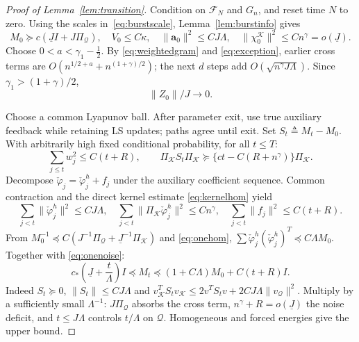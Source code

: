 \documentclass[11pt,reqno]{amsart}
\numberwithin{equation}{section}
\theoremstyle{definition}
\theoremstyle{remark}
\newcommand{\F}{\mathcal F}
\newcommand{\phc}{\check{\varphi}}
\begin{document}
\begin{proof}[Proof of Lemma~\ref{lem:transition}]
Condition on $\F_N$ and $G_n$, and reset time $N$ to zero. Using the scales in~\eqref{eq:burstscale}, Lemma~\ref{lem:burstinfo} gives
\begin{equation*}
 M_0\succeq c(\underline J I+J\Pi_{\mathcal Q}),\quad V_0\le C\kappa,\quad
 \|\mathbf a_0\|^2\le CJ\Lambda,\quad
 \|\chi_0^{\mathcal K}\|^2\le Cn^\gamma=o(\underline J).
\end{equation*}
Choose $0<a<\gamma_1-\tfrac12$. By \eqref{eq:weightedgram} and \eqref{eq:exception}, earlier cross terms are $O(n^{1/2+a}+n^{(1+\gamma)/2})$; the next $d$ steps add $O(\sqrt{n^\gamma J\Lambda})$. Since $\gamma_1>(1+\gamma)/2$,
\begin{equation*} \|Z_0\|/J\to0.\end{equation*}

Choose a common Lyapunov ball. After parameter exit, use true auxiliary feedback while retaining LS updates; paths agree until exit. Set $S_t\triangleq M_t-M_0$. With arbitrarily high fixed conditional probability, for all $t\le T$:
\begin{equation}\label{eq:onenoise}
 \sum_{j\le t}w_j^2\le C(t+R),\qquad
 \Pi_{\mathcal K} S_t\Pi_{\mathcal K}\succeq
 \{ct-C(R+n^\gamma)\}\Pi_{\mathcal K}.
\end{equation}
Decompose $\phc_j=\phc_j^h+f_j$ under the auxiliary coefficient sequence. Common contraction and the direct kernel estimate
\eqref{eq:kernelhom} yield
\begin{equation}\label{eq:onehom}
 \sum_{j<t}\|\phc_j^h\|^2\le CJ\Lambda,\quad
 \sum_{j<t}\|\Pi_{\mathcal K}\phc_j^h\|^2\le Cn^\gamma,\quad
 \sum_{j<t}\|f_j\|^2\le C(t+R).
\end{equation}
From $M_0^{-1}\preceq C(J^{-1}\Pi_{\mathcal Q}+\underline J^{-1}\Pi_{\mathcal K})$ and \eqref{eq:onehom},
$\sum\phc_j^h(\phc_j^h)^T\preceq C\Lambda M_0$. Together with \eqref{eq:onenoise}:
\begin{equation}\label{eq:onesandwich}
 c_*\left(\underline J+\frac{t}{\Lambda}\right)I
 \preceq M_t
 \preceq(1+C\Lambda)M_0+C(t+R)I.
\end{equation}
Indeed $S_t\succeq0$, $\|S_t\|\le CJ\Lambda$ and $v_{\mathcal K}^T S_tv_{\mathcal K}\le2v^T S_tv+2CJ\Lambda\|v_{\mathcal Q}\|^2$. Multiply by a sufficiently small $\Lambda^{-1}$: $J\Pi_{\mathcal Q}$ absorbs the cross term, $n^\gamma+R=o(\underline J)$ the noise deficit, and $t\le J\Lambda$ controls $t/\Lambda$ on $\mathcal Q$. Homogeneous and forced energies give the upper bound.


\end{proof}
\end{document}
